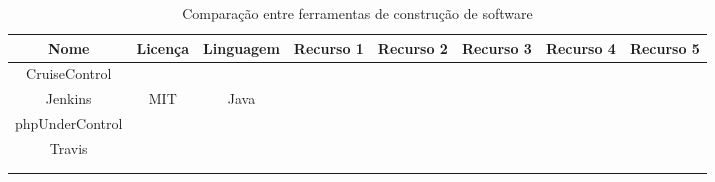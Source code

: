 \documentclass[12pt,a4paper]{article}
\begin{document}
		\begin{table}[h]
			\tabcolsep=0.11cm
			\begin{tabular}{|c|c|c|c|c|c|c|c|}
			\hline Nome 			& Licença 	& Linguagem & Recurso 1 & Recurso 2 & Recurso 3 & Recurso 4 & Recurso 5 \\ 
			\hline  CruiseControl	&  			&  			&  			&  			&  			&  			&  			\\ 
			\hline  Jenkins			& MIT		& Java		&  			&  			&  			&  			&  			\\ 
			\hline  phpUnderControl	&  			&  			&  			&  			&  			&  			&  			\\ 
			\hline  Travis			&  			&  			&  			&  			&  			&  			&  			\\ 
			\hline  				&  			&  			&  			&  			&  			&  			&  			\\ 
			\hline  				&  			&  			&  			&  			&  			&  			&  			\\ 
			\hline 
			\end{tabular} 
			\caption{Comparação entre ferramentas de construção de software}
		\end{table}
\clearpage
\nocite{*}
		
		
\end{document}
